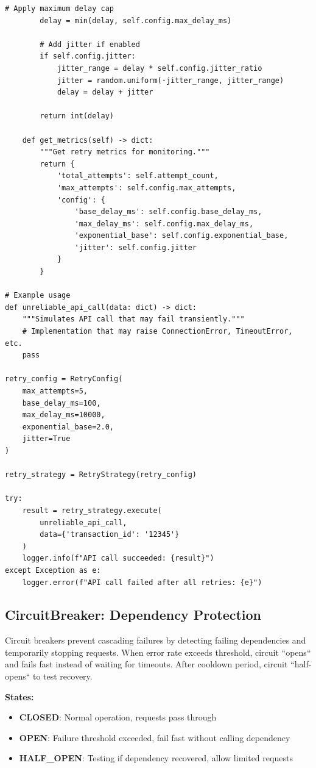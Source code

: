 \begin{lstlisting}[style=python, caption={Production Retry Strategy}]
        # Apply maximum delay cap
        delay = min(delay, self.config.max_delay_ms)

        # Add jitter if enabled
        if self.config.jitter:
            jitter_range = delay * self.config.jitter_ratio
            jitter = random.uniform(-jitter_range, jitter_range)
            delay = delay + jitter

        return int(delay)

    def get_metrics(self) -> dict:
        """Get retry metrics for monitoring."""
        return {
            'total_attempts': self.attempt_count,
            'max_attempts': self.config.max_attempts,
            'config': {
                'base_delay_ms': self.config.base_delay_ms,
                'max_delay_ms': self.config.max_delay_ms,
                'exponential_base': self.config.exponential_base,
                'jitter': self.config.jitter
            }
        }

# Example usage
def unreliable_api_call(data: dict) -> dict:
    """Simulates API call that may fail transiently."""
    # Implementation that may raise ConnectionError, TimeoutError, etc.
    pass

retry_config = RetryConfig(
    max_attempts=5,
    base_delay_ms=100,
    max_delay_ms=10000,
    exponential_base=2.0,
    jitter=True
)

retry_strategy = RetryStrategy(retry_config)

try:
    result = retry_strategy.execute(
        unreliable_api_call,
        data={'transaction_id': '12345'}
    )
    logger.info(f"API call succeeded: {result}")
except Exception as e:
    logger.error(f"API call failed after all retries: {e}")
\end{lstlisting}

\subsection{CircuitBreaker: Dependency Protection}

Circuit breakers prevent cascading failures by detecting failing dependencies and temporarily stopping requests. When error rate exceeds threshold, circuit ``opens`` and fails fast instead of waiting for timeouts. After cooldown period, circuit ``half-opens`` to test recovery.

\textbf{States:}
\begin{itemize}
    \item \textbf{CLOSED}: Normal operation, requests pass through
    \item \textbf{OPEN}: Failure threshold exceeded, fail fast without calling dependency
    \item \textbf{HALF\_OPEN}: Testing if dependency recovered, allow limited requests
\end{itemize}

